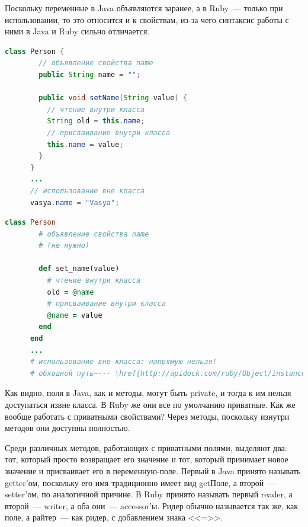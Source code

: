\documentclass[a4paper, 14pt, titlepage]{extarticle}
\newenvironment{halfpage}%
    {\noindent\begin{minipage}[h]{0.49\linewidth}} %
    {\end{minipage}\hfill}
\begin{document}
  Поскольку переменные в Java объявляются заранее, а в Ruby~--- только при использовании, то это
  относится и к свойствам, из-за чего синтаксис работы с ними в Java и Ruby сильно отличается.

  \begin{halfpage}
    \begin{lstlisting}[language=Java, title={Свойство в Java}, gobble=6, texcl]
      class Person {
        // объявление свойства name
        public String name = "";
        
        public void setName(String value) {
          // чтение внутри класса
          String old = this.name;
          // присваивание внутри класса
          this.name = value;
        }
      }
      ...
      // использование вне класса
      vasya.name = "Vasya";
    \end{lstlisting}
  \end{halfpage}
  \begin{halfpage}
    \begin{lstlisting}[language=Ruby, title={Свойство в Ruby}, gobble=6, texcl]
      class Person
        # объявление свойства name
        # (не нужно)

        def set_name(value)
          # чтение внутри класса
          old = @name
          # присваивание внутри класса
          @name = value
        end
      end
      ...
      # использование вне класса: напрямую нельзя!
      # обходной путь~--- \href{http://apidock.com/ruby/Object/instance_variable_set}{\uline{instance\_variable\_set}}/\href{http://apidock.com/ruby/Object/instance_variable_get}{\uline{get}}
    \end{lstlisting}
  \end{halfpage}

  Как видно, поля в Java, как и методы, могут быть private, и тогда к им нельзя доступаться извне
  класса. В Ruby же они все по умолчанию приватные. Как же вообще работать с приватными свойствами?
  Через методы, поскольку изнутри методов они доступны полностью.

  Среди различных методов, работающих с приватными полями, выделяют два: тот, который просто
  возвращает его значение и тот, который принимает новое значение и присваивает его в
  переменную-поле. Первый в Java принято называть getter'ом, поскольку его имя традиционно имеет вид
  getПоле, а второй~--- setter'ом, по аналогичной причине. В Ruby принято называть первый
  reader, а второй~--- writer, а оба они~--- accessor'ы. Ридер обычно называется так же, как поле, а
  райтер~--- как ридер, с добавлением знака <<=>>.
\end{document}
